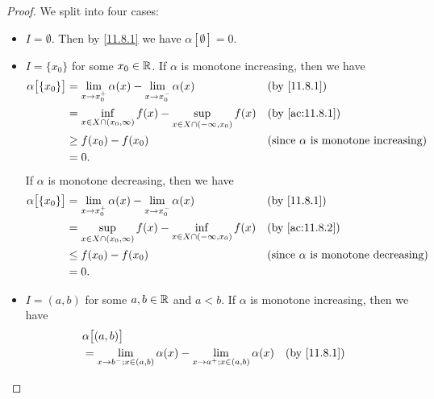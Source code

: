\begin{proof}
  We split into four cases:
  \begin{itemize}
    \item \(I = \emptyset\).
          Then by \cref{11.8.1} we have \(\alpha[\emptyset] = 0\).
    \item \(I = \{x_0\}\) for some \(x_0 \in \mathbb{R}\).
          If \(\alpha\) is monotone increasing, then we have
          \begin{align*}
            \alpha\big[\{x_0\}\big] & = \lim_{x \to x_0^+} \alpha(x) - \lim_{x \to x_0^-} \alpha(x)                      &  & \text{(by \cref{11.8.1})}                        \\
                                    & = \inf_{x \in X \cap (x_0, \infty)} f(x) - \sup_{x \in X \cap (-\infty, x_0)} f(x) &  & \text{(by \cref{ac:11.8.1})}                     \\
                                    & \geq f(x_0) - f(x_0)                                                               &  & \text{(since \(\alpha\) is monotone increasing)} \\
                                    & = 0.
          \end{align*}
          If \(\alpha\) is monotone decreasing, then we have
          \begin{align*}
            \alpha\big[\{x_0\}\big] & = \lim_{x \to x_0^+} \alpha(x) - \lim_{x \to x_0^-} \alpha(x)                      &  & \text{(by \cref{11.8.1})}                        \\
                                    & = \sup_{x \in X \cap (x_0, \infty)} f(x) - \inf_{x \in X \cap (-\infty, x_0)} f(x) &  & \text{(by \cref{ac:11.8.2})}                     \\
                                    & \leq f(x_0) - f(x_0)                                                               &  & \text{(since \(\alpha\) is monotone decreasing)} \\
                                    & = 0.
          \end{align*}
    \item \(I = (a, b)\) for some \(a, b \in \mathbb{R}\) and \(a < b\).
          If \(\alpha\) is monotone increasing, then we have
          \begin{align*}
             & \alpha\big[(a, b)\big]                                                                                                               \\
             & = \lim_{x \to b^- ; x \in (a, b)} \alpha(x) - \lim_{x \to a^+ ; x \in (a, b)} \alpha(x)            &  & \text{(by \cref{11.8.1})}    \\

\end{align*}
\end{itemize}
\end{proof}
